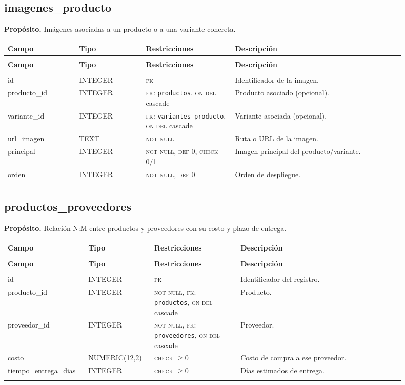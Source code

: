 \documentclass[11pt]{article}
\makeatletter
\newenvironment{campos}{%
  \par\footnotesize
  \setlength{\LTpre}{0.3ex}\setlength{\LTpost}{0.6ex}
  \begin{longtable}{@{}>{\ttfamily}p{0.165\linewidth} >{\ttfamily}p{0.150\linewidth} p{0.205\linewidth} >{\raggedright\arraybackslash}p{0.385\linewidth}@{}}
  \toprule
  \normalfont\bfseries Campo & \normalfont\bfseries Tipo & \normalfont\bfseries Restricciones & \normalfont\bfseries Descripción \\
  \midrule \endfirsthead
  \multicolumn{4}{@{}l}{\footnotesize\itshape \dots\ continuación}\\[0.3ex]
  \toprule
  \normalfont\bfseries Campo & \normalfont\bfseries Tipo & \normalfont\bfseries Restricciones & \normalfont\bfseries Descripción \\
  \midrule \endhead
  \midrule \multicolumn{4}{r@{}}{\footnotesize\itshape continúa en la siguiente página}\\ \endfoot
  \bottomrule \endlastfoot
}{%
  \end{longtable}\par
}
\newcommand{\proposito}[1]{\par\vspace{0.2ex}\noindent\colorbox{brandlight}{\parbox{\dimexpr\linewidth-2\fboxsep}{\small\textbf{Propósito.} #1}}\par\vspace{0.8ex}}
\newcommand{\pk}{\textsc{pk}}
\newcommand{\fk}[1]{\textsc{fk}: \texttt{#1}}
\newcommand{\nn}{\textsc{not null}}
\newcommand{\uq}{\textsc{unique}}
\makeatother
\begin{document}
\subsection{imagenes\_producto}
\proposito{Imágenes asociadas a un producto o a una variante concreta.}
\begin{campos}
id          & INTEGER & \pk{}       & Identificador de la imagen. \\
producto\_id & INTEGER & \fk{productos}, \textsc{on del} cascade & Producto asociado (opcional). \\
variante\_id & INTEGER & \fk{variantes\_producto}, \textsc{on del} cascade & Variante asociada (opcional). \\
url\_imagen & TEXT    & \nn         & Ruta o URL de la imagen. \\
principal   & INTEGER & \nn, \textsc{def} 0, \textsc{check} 0/1 & Imagen principal del producto/variante. \\
orden       & INTEGER & \nn, \textsc{def} 0 & Orden de despliegue. \\
\multicolumn{4}{@{}p{0.97\linewidth}}{\footnotesize\itshape Regla de tabla: \textsc{check} \texttt{producto\_id} o \texttt{variante\_id} no nulo (al menos uno).} \\
\end{campos}

\subsection{productos\_proveedores}
\proposito{Relación N:M entre productos y proveedores con su costo y plazo de entrega.}
\begin{campos}
id                  & INTEGER       & \pk{}   & Identificador del registro. \\
producto\_id        & INTEGER       & \nn, \fk{productos}, \textsc{on del} cascade & Producto. \\
proveedor\_id       & INTEGER       & \nn, \fk{proveedores}, \textsc{on del} cascade & Proveedor. \\
costo               & NUMERIC(12,2) & \textsc{check} $\geq 0$ & Costo de compra a ese proveedor. \\
tiempo\_entrega\_dias & INTEGER     & \textsc{check} $\geq 0$ & Días estimados de entrega. \\
\multicolumn{4}{@{}p{0.97\linewidth}}{\footnotesize\itshape Regla de tabla: \uq{} (\texttt{producto\_id}, \texttt{proveedor\_id}).} \\
\end{campos}
\end{document}
